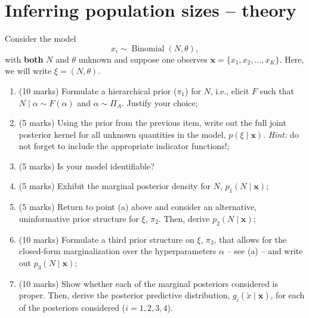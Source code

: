\documentclass[a4paper,10pt, notitlepage]{report}
\begin{document}
\section*{Inferring population sizes -- theory}

Consider the model
\begin{equation*}
 x_i \sim \operatorname{Binomial}(N, \theta),
\end{equation*}
with \textbf{both} $N$ and $\theta$ unknown and suppose one observes $\boldsymbol{x} = \{x_1, x_2, \ldots, x_K\}$.
Here, we will write $\xi = (N, \theta)$.

\begin{enumerate}[label=\alph*)]
 \item (10 marks) Formulate a hierarchical prior ($\pi_1$) for $N$, i.e., elicit $F$ such that $N \mid \alpha \sim F(\alpha)$ and $\alpha  \sim \Pi_A$.
 Justify your choice; 

 

 \item (5 marks) Using the prior from the previous item, write out the full joint posterior kernel for all unknown quantities in the model, $p(\xi \mid \boldsymbol{x})$. \textit{Hint:} do not forget to include the appropriate indicator functions!;
 
 

 \item (5 marks) Is your model identifiable?
 
 

 \item (5 marks) Exhibit the marginal posterior density for $N$, $p_1(N \mid \boldsymbol{x})$;
 
  

 \item (5 marks) Return to point (a) above and consider an alternative, uninformative prior structure for $\xi$, $\pi_2$.
 Then, derive $p_2(N \mid \boldsymbol{x})$;

 

 \item (10 marks) Formulate a third prior structure on $\xi$, $\pi_3$, that allows for the closed-form marginalization over the hyperparameters $\alpha$ -- see (a) -- and write out $p_3(N \mid \boldsymbol{x})$;
 
 

 \item (10 marks) Show whether each of the marginal posteriors considered is proper.
 Then, derive the posterior predictive distribution, $g_i(\tilde{x} \mid
 \boldsymbol{x})$, for each of the posteriors considered ($i = 1, 2, 3, 4$).
    

\end{enumerate}
\end{document}
